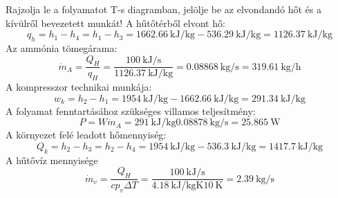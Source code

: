 Rajzolja le a folyamatot T-s diagramban, jelölje be az elvondandó hőt és a kívülről bevezetett munkát!
\vspace{2mm}
A hűtőtérből elvont hő:
\begin{equation}
q_h=h_1-h_4=h_1-h_3=\SI{1662.66}{\kilo\joule\per\kilo\gram}-\SI{536.29}{\kilo\joule\per\kilo\gram} = \SI{1126.37}{\kilo\joule\per\kilo\gram}
\end{equation}
Az ammónia tömegárama:
\begin{equation}
\dot{m}_A=\frac{Q_H}{q_H}=\frac{\SI{100}{\kilo\joule\per\second}}{\SI{1126.37}{\kilo\joule\per\kilo\gram}}=\SI{0.08868}{\kilo\gram\per\second}=\SI{319.61}{\kilo\gram\per\hour}
\end{equation}
A kompresszor technikai munkája:
\begin{equation}
w_k=h_2-h_1=\SI{1954}{\kilo\joule\per\kilo\gram}-\SI{1662.66}{\kilo\joule\per\kilo\gram}=\SI{291.34}{\kilo\joule\per\kilo\gram}
\end{equation}
A folyamat fenntartásához szükséges villamos teljesítmény:
\begin{equation}
P=W\dot{m}_A=\SI{291}{\kilo\joule\per\kilo\gram}\SI{0.08878}{\kilo\gram\per\second}=\SI{25.865}{\watt}
\end{equation}
A környezet felé leadott hőmennyiség:
\begin{equation}
Q_k=h_2-h_3=h_2-h_4=\SI{1954}{\kilo\joule\per\kilo\gram}-\SI{536.3}{\kilo\joule\per\kilo\gram}=\SI{1417.7}{\kilo\joule\per\kilo\gram}
\end{equation}
A hűtővíz mennyisége
\begin{equation}
\dot{m}_v=\frac{Q_H}{cp_v\Delta T} = \frac{\SI{100}{\kilo\joule\per\second}}{\SI{4.18}{\kilo\joule\per\kilo\gram\kelvin}\SI{10}{\kelvin}}=\SI{2.39}{\kilo\gram\per\second}
\end{equation}
